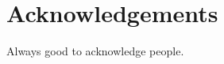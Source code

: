 \section*{Acknowledgements}

\vspace{2cm}

\large{\raggedright
Always good to acknowledge people. %
}
